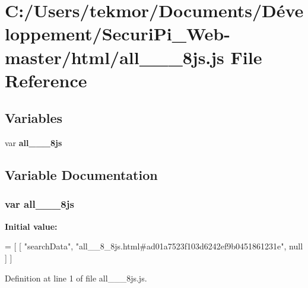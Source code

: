 \section{C\+:/\+Users/tekmor/\+Documents/\+Développement/\+Securi\+Pi\+\_\+\+Web-\/master/html/all\+\_\+\+\_\+\_\+8js.js File Reference}
\label{all____8__8js_8js}
\subsection*{Variables}
\begin{DoxyCompactItemize}
\item 
var {\bf all\+\_\+\+\_\+\_\+8js}
\end{DoxyCompactItemize}


\subsection{Variable Documentation}
\subsubsection[{all\+\_\+\+\_\+8\+\_\+8js}]{\setlength{\rightskip}{0pt plus 5cm}var all\+\_\+\+\_\+\_\+8js}\label{all____8__8js_8js_a0a529b809c1d781cec480fa87d8d3c82}
{\bfseries Initial value\+:}
\begin{DoxyCode}
=
[
    [ \textcolor{stringliteral}{"searchData"}, \textcolor{stringliteral}{"all\_\_8\_8js.html#ad01a7523f103d6242ef9b0451861231e"}, null ]
]
\end{DoxyCode}


Definition at line 1 of file all\+\_\+\+\_\+\_\+8js.\+js.

